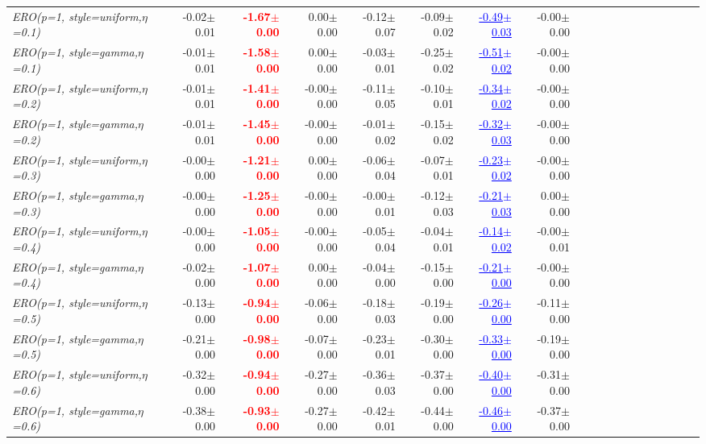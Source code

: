 \documentclass[nohyperref]{article}
\theoremstyle{plain}
\theoremstyle{definition}
\theoremstyle{remark}
\newcommand{\red}[1]{\textcolor{red}{\textbf{#1}}}
\newcommand{\blue}[1]{\textcolor{blue}{\underline{#1}}}
\begin{document}
\begin{table*}[!ht]
{\begin{tabular}{lrrrrrrrrrrrrrrrrrr}
			{\it ERO(p=1, style=uniform,$\eta$=0.1)} & -0.02$\pm$0.01 & \red{-1.67$\pm$0.00} & 0.00$\pm$0.00 & -0.12$\pm$0.07 & -0.09$\pm$0.02 & \blue{-0.49$\pm$0.03} & -0.00$\pm$0.00 \\
			{\it ERO(p=1, style=gamma,$\eta$=0.1)} & -0.01$\pm$0.01 & \red{-1.58$\pm$0.00} & 0.00$\pm$0.00 & -0.03$\pm$0.01 & -0.25$\pm$0.02 & \blue{-0.51$\pm$0.02} & -0.00$\pm$0.00 \\
			{\it ERO(p=1, style=uniform,$\eta$=0.2)} & -0.01$\pm$0.01 & \red{-1.41$\pm$0.00} & -0.00$\pm$0.00 & -0.11$\pm$0.05 & -0.10$\pm$0.01 & \blue{-0.34$\pm$0.02} & -0.00$\pm$0.00 \\
			{\it ERO(p=1, style=gamma,$\eta$=0.2)} & -0.01$\pm$0.01 & \red{-1.45$\pm$0.00} & -0.00$\pm$0.00 & -0.01$\pm$0.02 & -0.15$\pm$0.02 & \blue{-0.32$\pm$0.03} & -0.00$\pm$0.00 \\
			{\it ERO(p=1, style=uniform,$\eta$=0.3)} & -0.00$\pm$0.00 & \red{-1.21$\pm$0.00} & 0.00$\pm$0.00 & -0.06$\pm$0.04 & -0.07$\pm$0.01 & \blue{-0.23$\pm$0.02} & -0.00$\pm$0.00 \\
			{\it ERO(p=1, style=gamma,$\eta$=0.3)} & -0.00$\pm$0.00 & \red{-1.25$\pm$0.00} & -0.00$\pm$0.00 & -0.00$\pm$0.01 & -0.12$\pm$0.03 & \blue{-0.21$\pm$0.03} & 0.00$\pm$0.00 \\
			{\it ERO(p=1, style=uniform,$\eta$=0.4)} & -0.00$\pm$0.00 & \red{-1.05$\pm$0.00} & -0.00$\pm$0.00 & -0.05$\pm$0.04 & -0.04$\pm$0.01 & \blue{-0.14$\pm$0.02} & -0.00$\pm$0.01 \\
			{\it ERO(p=1, style=gamma,$\eta$=0.4)} & -0.02$\pm$0.00 & \red{-1.07$\pm$0.00} & 0.00$\pm$0.00 & -0.04$\pm$0.00 & -0.15$\pm$0.00 & \blue{-0.21$\pm$0.00} & -0.00$\pm$0.00 \\
			{\it ERO(p=1, style=uniform,$\eta$=0.5)} & -0.13$\pm$0.00 & \red{-0.94$\pm$0.00} & -0.06$\pm$0.00 & -0.18$\pm$0.03 & -0.19$\pm$0.00 & \blue{-0.26$\pm$0.00} & -0.11$\pm$0.00 \\
			{\it ERO(p=1, style=gamma,$\eta$=0.5)} & -0.21$\pm$0.00 & \red{-0.98$\pm$0.00} & -0.07$\pm$0.00 & -0.23$\pm$0.01 & -0.30$\pm$0.00 & \blue{-0.33$\pm$0.00} & -0.19$\pm$0.00 \\
			{\it ERO(p=1, style=uniform,$\eta$=0.6)} & -0.32$\pm$0.00 & \red{-0.94$\pm$0.00} & -0.27$\pm$0.00 & -0.36$\pm$0.03 & -0.37$\pm$0.00 & \blue{-0.40$\pm$0.00} & -0.31$\pm$0.00 \\
			{\it ERO(p=1, style=gamma,$\eta$=0.6)} & -0.38$\pm$0.00 & \red{-0.93$\pm$0.00} & -0.27$\pm$0.00 & -0.42$\pm$0.01 & -0.44$\pm$0.00 & \blue{-0.46$\pm$0.00} & -0.37$\pm$0.00 \\

\end{tabular}}
\end{table*}
\end{document}
